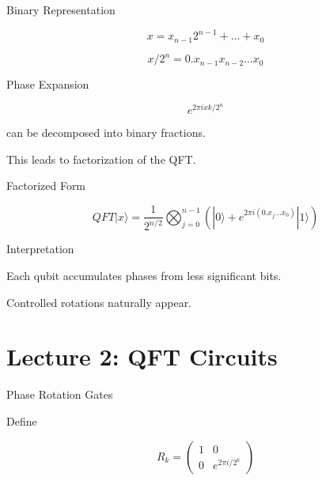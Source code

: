 \documentclass{beamer}
\begin{document}

\begin{frame}{Binary Representation}

\[
x=x_{n-1}2^{n-1}+\dots+x_0
\]

\[
x/2^n=0.x_{n-1}x_{n-2}\dots x_0
\]

\end{frame}


\begin{frame}{Phase Expansion}

\[
e^{2\pi i xk/2^n}
\]

can be decomposed into binary fractions.

This leads to factorization of the QFT.

\end{frame}


\begin{frame}{Factorized Form}

\[
QFT|x\rangle=
\frac{1}{2^{n/2}}
\bigotimes_{j=0}^{n-1}
(|0\rangle+
e^{2\pi i(0.x_j\dots x_0)}|1\rangle)
\]

\end{frame}


\begin{frame}{Interpretation}

Each qubit accumulates phases from less significant bits.

Controlled rotations naturally appear.

\end{frame}

\section{Lecture 2: QFT Circuits}

\begin{frame}{Phase Rotation Gates}

Define

\[
R_k=
\begin{pmatrix}
1&0\\
0&e^{2\pi i/2^k}
\end{pmatrix}
\]

\end{frame}
\end{document}
